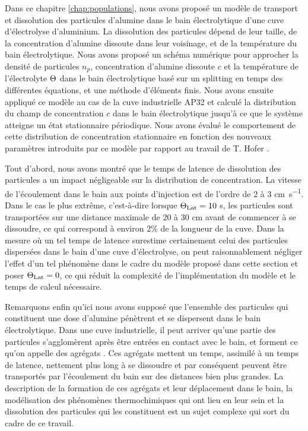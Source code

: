 Dans ce chapitre \ref{chap:populations}, nous avons proposé un modèle de transport et
dissolution des particules d'alumine dans le bain électrolytique d'une
cuve d'électrolyse d'aluminium. La dissolution des particules dépend
de leur taille, de la concentration d'alumine dissoute dans leur
voisinage, et de la température du bain électrolytique. Nous avons
proposé un schéma numérique pour approcher la densité de particules
$n_p$, concentration d'alumine dissoute $c$ et la température de
l'électrolyte $\Theta$ dans le bain électrolytique basé sur un
splitting en temps des différentes équations, et une méthode d'éléments
finis. Nous avons ensuite
appliqué ce modèle au cas de la cuve industrielle AP32 et calculé la
distribution du champ de concentration $c$ dans le bain électrolytique
jusqu'à ce que le système atteigne un état stationnaire
périodique. Nous avons évalué le comportement de cette distribution de
concentration stationnaire en fonction des nouveaux paramètres
introduits par ce modèle par rapport au travail de T. Hofer
\cite{Hofer2011}.

Tout d'abord, nous avons montré que le temps de latence de dissolution
des particules a un impact négligeable sur la distribution de
concentration. La vitesse de l'écoulement dans le bain aux points
d'injection est de l'ordre de 2 à 3 \si{\centi\meter\per\second}. Dans
le cas le plus extrême, c'est-à-dire lorsque $\Theta_\text{Lat} = 10$
\si{\second}, les particules sont transportées sur une distance
maximale de 20 à 30 \si{\centi\meter} avant de commencer à se
dissoudre, ce qui correspond à environ 2\% de la longueur de la
cuve. Dans la mesure où un tel temps de latence surestime certainement
celui des particules dispersées dans le bain d'une cuve d'électrolyse,
on peut raisonnablement négliger l'effet d'un tel phénomène dans le
cadre du modèle proposé dans cette section et poser $\Theta_\text{Lat} = 0$, ce
qui réduit la complexité de l'implémentation du modèle et le temps de
calcul nécessaire.

Remarquons enfin qu'ici nous avons supposé que l'ensemble des
particules qui constituent une dose d'alumine pénètrent et se
dispersent dans le bain électrolytique. Dans une cuve industrielle, il
peut arriver qu'une partie des particules s'agglomèrent après être
entrées en contact avec le bain, et forment ce qu'on appelle des agrégats
\cite{Dassylva2015}. Ces agrégats mettent un temps, assimilé à un
temps de latence, nettement plus long à se dissoudre et par conséquent
peuvent être transportés par l'écoulement du bain sur des distances bien
plus grandes. La description de la formation de ces agrégats et leur
déplacement dans le bain, la modélisation des phénomènes
thermochimiques qui ont lieu en leur sein et la dissolution des
particules qui les constituent est un sujet complexe qui sort du cadre
de ce travail.

